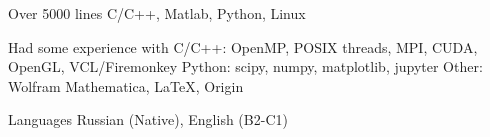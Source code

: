 

\begin{cvskills}

  \cvskill
    {Over 5000 lines} %
    {C/C++, Matlab, Python, Linux} %

  \cvskill
    {Had some experience with} %
    {\newline C/C++: OpenMP, POSIX threads, MPI, CUDA, OpenGL, VCL/Firemonkey \newline Python: scipy, numpy, matplotlib, jupyter \newline Other: Wolfram Mathematica, \LaTeX, Origin \newline} %

  \cvskill
    {Languages} %
    {Russian (Native), English (B2-C1)} %

\end{cvskills}
